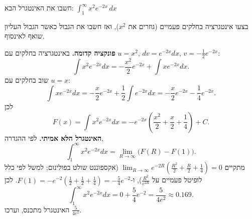 
\begin{question}
חשבו את האינטגרל הבא:
$\displaystyle\int_1^\infty x^2e^{-2x}\,dx$
\end{question}

\begin{hint}
בצעו אינטגרציה בחלקים פעמיים (גוזרים את $x^2$), ואז חשבו את הגבול כאשר הגבול העליון שואף לאינסוף.
\end{hint}

\begin{solution}
\textbf{פונקציה קדומה.} באינטגרציה בחלקים עם $u=x^2$, $dv=e^{-2x}dx$, $v=-\frac12e^{-2x}$:
\[
\int x^2e^{-2x}dx=-\frac{x^2}{2}e^{-2x}+\int xe^{-2x}dx.
\]
שוב בחלקים עם $u=x$:
\[
\int xe^{-2x}dx=-\frac x2e^{-2x}+\frac12\int e^{-2x}dx=-\frac x2e^{-2x}-\frac14e^{-2x}.
\]
לכן
\[
F(x)=\int x^2e^{-2x}dx=-e^{-2x}\left(\frac{x^2}{2}+\frac x2+\frac14\right)+C.
\]
\textbf{האינטגרל הלא אמיתי.} לפי ההגדרה,
\[
\int_1^\infty x^2e^{-2x}dx=\lim_{R\to\infty}\big(F(R)-F(1)\big).
\]
מתקיים $\lim_{R\to\infty}e^{-2R}\left(\frac{R^2}{2}+\frac R2+\frac14\right)=0$ (אקספוננט שולט בפולינום; למשל לפי כלל לופיטל פעמיים על $\frac{R^2}{e^{2R}}$), ו-$F(1)=-e^{-2}\left(\frac12+\frac12+\frac14\right)=-\frac54e^{-2}$. לכן
\[
\int_1^\infty x^2e^{-2x}dx=0+\frac54e^{-2}=\frac{5}{4e^2}\approx0.169.
\]
האינטגרל מתכנס, וערכו $\frac{5}{4e^2}$.
\end{solution}
